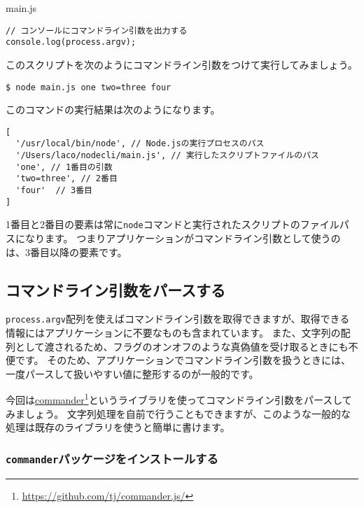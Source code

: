 \begin{listtitle}
main.js
\end{listtitle}
\begin{lstlisting}
// コンソールにコマンドライン引数を出力する
console.log(process.argv);
\end{lstlisting}
\listend

このスクリプトを次のようにコマンドライン引数をつけて実行してみましょう。

\begin{lstlisting}
$ node main.js one two=three four
\end{lstlisting}

このコマンドの実行結果は次のようになります。

\begin{lstlisting}
[ 
  '/usr/local/bin/node', // Node.jsの実行プロセスのパス
  '/Users/laco/nodecli/main.js', // 実行したスクリプトファイルのパス
  'one', // 1番目の引数
  'two=three', // 2番目
  'four'  // 3番目
]
\end{lstlisting}

1番目と2番目の要素は常に\texttt{node}コマンドと実行されたスクリプトのファイルパスになります。
つまりアプリケーションがコマンドライン引数として使うのは、3番目以降の要素です。

\hypertarget{parse-args}{%
\subsection{コマンドライン引数をパースする}\label{parse-args}}

\texttt{process.argv}配列を使えばコマンドライン引数を取得できますが、取得できる情報にはアプリケーションに不要なものも含まれています。
また、文字列の配列として渡されるため、フラグのオンオフのような真偽値を受け取るときにも不便です。
そのため、アプリケーションでコマンドライン引数を扱うときには、一度パースして扱いやすい値に整形するのが一般的です。

今回は\href{https://github.com/tj/commander.js/}{commander}\footnote{\url{https://github.com/tj/commander.js/}}というライブラリを使ってコマンドライン引数をパースしてみましょう。
文字列処理を自前で行うこともできますが、このような一般的な処理は既存のライブラリを使うと簡単に書けます。

\hypertarget{install-commander}{%
\subsubsection{\texorpdfstring{\texttt{commander}パッケージをインストールする}{commanderパッケージをインストールする}}\label{install-commander}}

